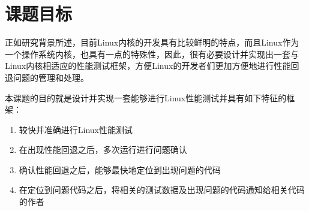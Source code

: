 \section{课题目标}

正如研究背景所述，目前Linux内核的开发具有比较鲜明的特点，而且Linux作为一个操作系统内核，也具有一点的特殊性，因此，很有必要设计并实现出一套与Linux内核相适应的性能测试框架，方便Linux的开发者们更加方便地进行性能回退问题的管理和处理。

本课题的目的就是设计并实现一套能够进行Linux性能测试并具有如下特征的框架：

\begin{enumerate}
\item 较快并准确进行Linux性能测试
\item 在出现性能回退之后，多次运行进行问题确认
\item 确认性能回退之后，能够最快地定位到出现问题的代码
\item 在定位到问题代码之后，将相关的测试数据及出现问题的代码通知给相关代码的作者
\end{enumerate}